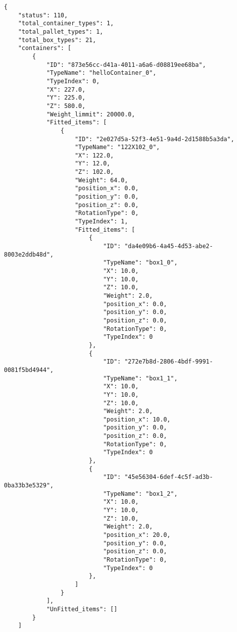 \documentclass{article}
\begin{document}
\begin{mdframed}[backgroundcolor=bg]
\begin{verbatim}
{
    "status": 110,
    "total_container_types": 1,
    "total_pallet_types": 1,
    "total_box_types": 21,
    "containers": [
        {
            "ID": "873e56cc-d41a-4011-a6a6-d08819ee68ba",
            "TypeName": "helloContainer_0",
            "TypeIndex": 0,
            "X": 227.0,
            "Y": 225.0,
            "Z": 580.0,
            "Weight_limmit": 20000.0,
            "Fitted_items": [
                {
                    "ID": "2e027d5a-52f3-4e51-9a4d-2d1588b5a3da",
                    "TypeName": "122X102_0",
                    "X": 122.0,
                    "Y": 12.0,
                    "Z": 102.0,
                    "Weight": 64.0,
                    "position_x": 0.0,
                    "position_y": 0.0,
                    "position_z": 0.0,
                    "RotationType": 0,
                    "TypeIndex": 1,
                    "Fitted_items": [
                        {
                            "ID": "da4e09b6-4a45-4d53-abe2-8003e2ddb48d",
                            "TypeName": "box1_0",
                            "X": 10.0,
                            "Y": 10.0,
                            "Z": 10.0,
                            "Weight": 2.0,
                            "position_x": 0.0,
                            "position_y": 0.0,
                            "position_z": 0.0,
                            "RotationType": 0,
                            "TypeIndex": 0
                        },
                        {
                            "ID": "272e7b8d-2806-4bdf-9991-0081f5bd4944",
                            "TypeName": "box1_1",
                            "X": 10.0,
                            "Y": 10.0,
                            "Z": 10.0,
                            "Weight": 2.0,
                            "position_x": 10.0,
                            "position_y": 0.0,
                            "position_z": 0.0,
                            "RotationType": 0,
                            "TypeIndex": 0
                        },
                        {
                            "ID": "45e56304-6def-4c5f-ad3b-0ba33b3e5329",
                            "TypeName": "box1_2",
                            "X": 10.0,
                            "Y": 10.0,
                            "Z": 10.0,
                            "Weight": 2.0,
                            "position_x": 20.0,
                            "position_y": 0.0,
                            "position_z": 0.0,
                            "RotationType": 0,
                            "TypeIndex": 0
                        },
                    ]
                }
            ],
            "UnFitted_items": []
        }
    ]
\end{verbatim}
\end{mdframed}
\end{document}
